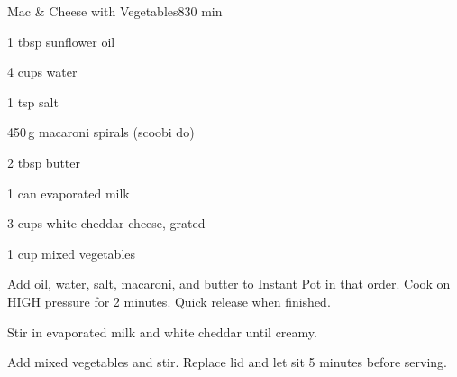 \begin{recipebox}{Mac \& Cheese with Vegetables}{8}{30 min}
  \begin{ingredients}
    \item 1 tbsp sunflower oil
    \item 4 cups water
    \item 1 tsp salt
    \item 450\,g macaroni spirals (scoobi do)
    \item 2 tbsp butter
    \item 1 can evaporated milk
    \item 3 cups white cheddar cheese, grated
    \item 1 cup mixed vegetables
  \end{ingredients}

  \begin{method}
    \item Add oil, water, salt, macaroni, and butter to Instant Pot in that order.
          Cook on HIGH pressure for 2 minutes. Quick release when finished.
    \item Stir in evaporated milk and white cheddar until creamy.
    \item Add mixed vegetables and stir. Replace lid and let sit 5 minutes before serving.           
  \end{method}
\end{recipebox}
